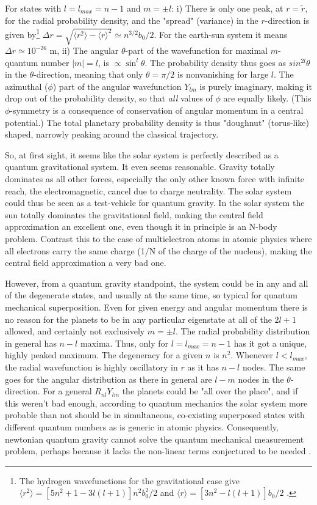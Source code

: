	For states with $l = l_{max} = n-1$ and $m = \pm l$: i) There is
	only one peak, at $r = \tilde{r}$, for the radial probability
	density, and the "spread" (variance) in the $r$-direction is
	given by\footnote{The hydrogen wavefunctions for the gravitational
	case give $\langle r^2 \rangle = [5n^2 + 1 -3l(l+1)] n^2 b_0^2 /2$
	and $\langle r \rangle = [3n^2 - l(l+1)]b_0 /2$ .} $\Delta r =
	\sqrt{\langle r^2 \rangle - \langle r \rangle^2} \simeq n^{3/2}
	b_0 /2$. For the earth-sun system it means $\Delta r \simeq
	10^{-26}$ m, ii) The angular $\theta$-part of the wavefunction for
	maximal $m$-quantum number $|m| = l$, is $\propto \sin^{l}\theta$.
	The probability density thus goes as $sin^{2l} \theta$ in the
	$\theta$-direction, meaning that only $\theta = \pi /2$ is
	nonvanishing for large $l$. The azimuthal ($\phi$) part of the
	angular wavefunction $Y_{lm}$ is purely imaginary, making it drop
	out of the probability density, so that \textit{all} values of
	$\phi$ are equally likely. (This $\phi$-symmetry is a consequence
	of conservation of angular momentum in a central potential.) The
	total planetary probability density is thus "doughnut"
	(torus-like) shaped, narrowly peaking around the classical
	trajectory.
	
	So, at first sight, it seems like the solar system is perfectly
	described as a quantum gravitational system. It even seems
	reasonable. Gravity totally dominates as all other forces,
	especially the only other known force with infinite reach, the
	electromagnetic, cancel due to charge neutrality. The solar system
	could thus be seen as a test-vehicle for quantum gravity. In the
	solar system the sun totally dominates the gravitational field,
	making the central field approximation an excellent one, even
	though it in principle is an N-body problem. Contrast this to the
	case of multielectron atoms in atomic physics where all electrons
	carry the same charge (1/N of the charge of the nucleus), making
	the central field approximation a very bad one.
	
	However, from a quantum gravity standpoint, the system could be in
	any and all of the degenerate states, and usually at the same
	time, so typical for quantum mechanical superposition. Even for
	given energy and angular momentum there is no reason for the
	planets to be in any particular eigenstate at all of the $2l +1$
	allowed, and certainly not exclusively $m = \pm l$. The radial
	probability distribution in general has $n-l$ maxima. Thus, only
	for $l = l_{max} = n-1$ has it got a unique, highly peaked
	maximum. The degeneracy for a given $n$ is $n^2$. Whenever $l <
	l_{max}$, the radial wavefunction is highly oscillatory in $r$ as
	it has $n-l$ nodes. The same goes for the angular distribution as
	there in general are $l-m$ nodes in the $\theta$-direction. For a
	general $R_{nl} Y_{lm}$ the planets could be "all over the
	place", and if this weren't bad enough, according to quantum
	mechanics the solar system more probable than not should be in
	simultaneous, co-existing superposed states with different quantum
	numbers as is generic in atomic physics. Consequently, newtonian
	quantum gravity cannot solve the quantum mechanical measurement
	problem, perhaps because it lacks the non-linear terms conjectured
	to be needed \cite{Penrose}.
	
